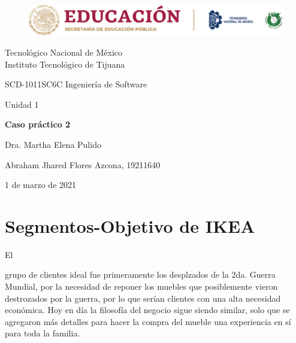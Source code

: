 \documentclass[stu, 12pt, letterpaper, donotrepeattitle, floatsintext, natbib]{apa7}
\begin{document}
    \begin{titlepage}
        \begin{figure}[ht]
            \centering
            \includegraphics[width=15cm]{logosITT.png}
        \end{figure}
        \centering
        {\Large Tecnológico Nacional de México\\Instituto Tecnológico de Tijuana\par}
        \vspace{1cm}
        {\Large SCD-1011SC6C Ingeniería de Software\par}
        \vspace{1cm}
        {\Large Unidad 1\par}
        \vspace{2cm}
        {\Large\bfseries Caso práctico 2\par}
        \vspace{2cm}
        {\large Dra. Martha Elena Pulido\par}
        \vfill
            {\large Abraham Jhared Flores Azcona, 19211640\par}
        \vfill
        {\large 1 de marzo de 2021}
    \end{titlepage}

\renewcommand\contentsname{Contenido}
\tableofcontents

\newpage
\section{Segmentos-Objetivo de IKEA}
El \begin{justifying}
    grupo de clientes ideal fue primeramente los desplzados de la 2da. Guerra Mundial, por la necesidad de reponer los muebles que posiblemente
vieron destrozados por la guerra, por lo que serían clientes con una alta necesidad económica. Hoy en día la filosofía del negocio sigue siendo
similar, solo que se agregaron más detalles para hacer la compra del mueble una experiencia en sí para toda la familia.\par
\end{justifying}
\vspace{\baselineskip}
\end{document}
